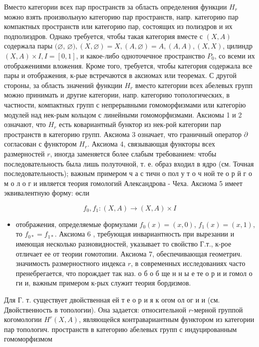 \documentclass[10pt]{article}
\begin{document}
Вместо категории всех пар пространств за область определения функции $H_{r}$ можно взять произвольную категорию пар пространств, напр. категорию пар компактных пространств или категорию пар, состоящих из полиэдров и их подполиэдров. Однако требуется, чтобы такая категория вместе с $(X, A)$ содержала пары $(\varnothing$, $\varnothing),(X, \varnothing)=X,(A, \varnothing)=A,(A, A),(X, X)$, цилиндр $(X, A) \times I, I=[0,1]$, и какое-либо одноточечное пространство $P_{0}$, со всеми их отображениями вложения. Кроме того, требуется, чтобы категория содержала все пары и отображения, к-рые встречаются в аксиомах или теоремах. С другой стороны, за область значений функции $H_{r}$ вместо категории всех абелевых групп можно принимать и другие категории, напр. категорию топологических, в частности, компактных групп с непрерывными гомоморфизмами или категорію модулей над нек-рым кольцом с линейными гомоморфизмами. Аксиомы 1 и 2 означают, что $H_{r}$ есть ковариантный бунктор из нек-рой категории пар пространств в категорию групп. Аксиома 3 означает, что граничный оператор $\partial$ согласован с функтором $H_{r}$. Аксиома 4, связывающая функторы всех размерностей $r$, иногда заменяется более слабым требованием: чтобы последовательность была лишь полуточной, т. е. образ входил в ядро (см. Точная последовательность); важным примером ч а с тичн о пол у т о ч ной те о р й г о м о л о г и ивляется теория гомологий Александрова - Чеха. Аксиома 5 имеет эквивалентную форму: өсли



\[

f_{0}, f_{1}:(X, A) \rightarrow(X, A) \times I

\]



\begin{itemize}

  \item отображения, определяемые формулами $f_{0}(x)=(x, 0)$, $f_{1}(x)=(x, 1)$, то $f_{0 *}=f_{1 *}$. Аксиома 6 , требующая инвариантность при вырезании и имеющая несколько разновидностей, указывает то свойство Г.т., к-рое отличает ее от теории гомотопии. Аксиома 7, обеспечивающая геометрич. значимость размерностного индекса $r$, в современных исследованиях часто пренебрегается, что порождает так наз. о б о б ще н н ы е те о р и и гомол о ги и, важным примером к-рых служит теория бордизмов.

\end{itemize}



Для Г. т. существует двойственная ей т е о р и я к огом ол ог и и (см. Двойственность в топологии). Она задается: относительной $r$-мерной группой когомологии $H^{r}(X, A)$, являющейся контравариантным функтором из категории пар топологич. пространств в категорию абелевых групп с индуцированным гомоморфизмом
\end{document}
